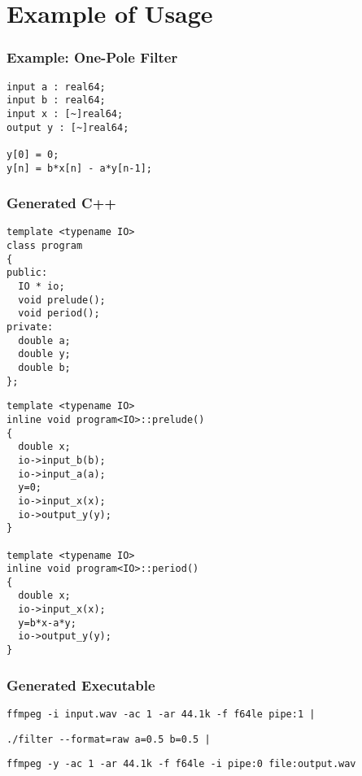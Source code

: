\documentclass{beamer}
\begin{document}
\section{Example of Usage}

\begin{frame}[fragile]
\frametitle{Example: One-Pole Filter}

\centering

\begin{BVerbatim}
input a : real64;
input b : real64;
input x : [~]real64;
output y : [~]real64;

y[0] = 0;
y[n] = b*x[n] - a*y[n-1];
\end{BVerbatim}

\end{frame}


\begin{frame}[fragile]
\frametitle{Generated C++}

\footnotesize
\begin{minipage}{0.49\linewidth}
\begin{BVerbatim}
template <typename IO>
class program
{
public:
  IO * io;
  void prelude();
  void period();
private:
  double a;
  double y;
  double b;
};
\end{BVerbatim}
\end{minipage}\hfill
\begin{minipage}{0.49\linewidth}
\begin{BVerbatim}
template <typename IO>
inline void program<IO>::prelude()
{
  double x;
  io->input_b(b);
  io->input_a(a);
  y=0;
  io->input_x(x);
  io->output_y(y);
}

template <typename IO>
inline void program<IO>::period()
{
  double x;
  io->input_x(x);
  y=b*x-a*y;
  io->output_y(y);
}
\end{BVerbatim}
\end{minipage}

\end{frame}


\begin{frame}[fragile]
\frametitle{Generated Executable}

\small

\begin{Verbatim}
ffmpeg -i input.wav -ac 1 -ar 44.1k -f f64le pipe:1 |
\end{Verbatim}

{
\bf
\begin{Verbatim}
./filter --format=raw a=0.5 b=0.5 |
\end{Verbatim}
}

\begin{Verbatim}
ffmpeg -y -ac 1 -ar 44.1k -f f64le -i pipe:0 file:output.wav
\end{Verbatim}

\end{frame}
\end{document}
